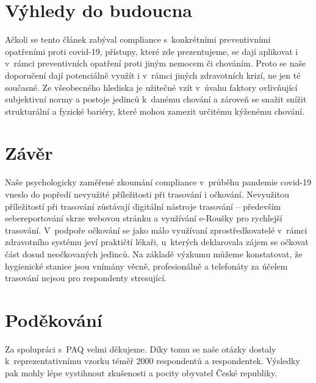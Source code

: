 \section*{Výhledy do budoucna }

Ačkoli se tento článek zabýval compliance s~konkrétními preventivními opatřeními proti covid-19, přístupy, které zde prezentujeme, se dají aplikovat i v~rámci preventivních opatření proti jiným nemocem či chováním. Proto se naše doporučení dají potenciálně využít i v~rámci jiných zdravotních krizí, ne jen té současné. Ze všeobecného hlediska je užitečné vzít v~úvahu faktory ovlivňující subjektivní normy a postoje jedinců k~danému chování a zároveň se snažit snížit strukturální a fyzické bariéry, které mohou zamezit určitému kýženému chování. 

\section*{Závěr}

Naše psychologicky zaměřené zkoumání compliance v~průběhu pandemie covid-19 vneslo do popředí nevyužité příležitosti při trasování i očkování. Nevyužitou pří\-le\-ži\-tos\-tí při trasování zůstávají digitální nástroje trasování -- především sebereportování skrze webovou stránku a využívání e-Roušky pro rychlejší trasování. V~podpoře očkování se jako málo využívaní zprostředkovatelé v~rámci zdravotního systému jeví praktičtí lékaři, u~kterých deklarovala zájem se očkovat část dosud neočkovaných jedinců. Na základě výzkumu můžeme konstatovat, že hygienické stanice jsou vnímány věcně, profesionálně a telefonáty za účelem trasování nejsou pro respondenty stresující. 

\section*{Poděkování}

Za spolupráci s~PAQ velmi děkujeme. Díky tomu se naše otázky dostaly k~reprezentativnímu vzorku téměř 2000 respondentů a respondentek. Výsledky pak mohly lépe vystihnout zkušenosti a pocity obyvatel České republiky.